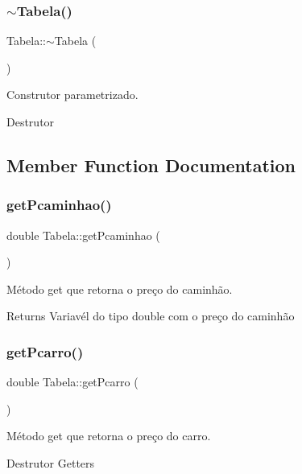 \subsubsection{\texorpdfstring{$\sim$\+Tabela()}{~Tabela()}}
{\footnotesize\ttfamily Tabela\+::$\sim$\+Tabela (\begin{DoxyParamCaption}{ }\end{DoxyParamCaption})}

Construtor parametrizado.

Destrutor 

\subsection{Member Function Documentation}
\mbox{\label{classTabela_a0167b9de146e9b60cc807912dd8a4652}} 
\subsubsection{\texorpdfstring{get\+Pcaminhao()}{getPcaminhao()}}
{\footnotesize\ttfamily double Tabela\+::get\+Pcaminhao (\begin{DoxyParamCaption}{ }\end{DoxyParamCaption})}



Método get que retorna o preço do caminhão. 

\begin{DoxyReturn}{Returns}
Variavél do tipo double com o preço do caminhão 
\end{DoxyReturn}
\mbox{\label{classTabela_af8df006567638a44fec8e0951b794c4b}} 
\subsubsection{\texorpdfstring{get\+Pcarro()}{getPcarro()}}
{\footnotesize\ttfamily double Tabela\+::get\+Pcarro (\begin{DoxyParamCaption}{ }\end{DoxyParamCaption})}



Método get que retorna o preço do carro. 

Destrutor Getters

